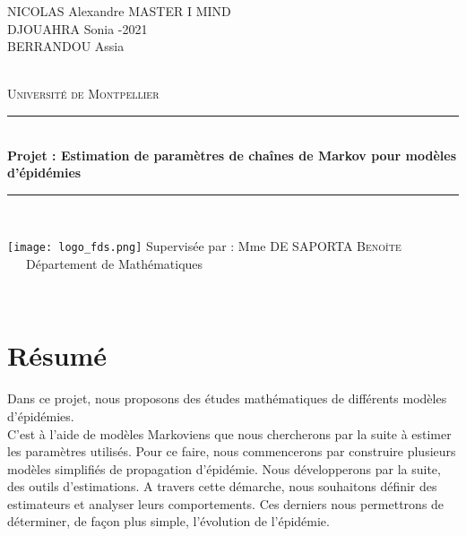 \documentclass[12pt,a4paper]{report}
\newcommand{\HRule}{\rule{\linewidth}{0.5mm}}
\theoremstyle{remark}
\begin{document}
\begin{titlepage}
  \begin{sffamily}  
      \flushleft NICOLAS Alexandre \qquad \qquad \qquad \qquad \qquad\qquad \qquad \qquad  \qquad\qquad \qquad \qquad \qquad  MASTER I MIND
      \\DJOUAHRA Sonia \qquad \qquad \qquad    \qquad \qquad \qquad \qquad \qquad \qquad \qquad \qquad \qquad \qquad \qquad {}-2021
      \\BERRANDOU Assia 

  \begin{center}
 \textsc{}\\[4cm]
    \textsc{\LARGE Université de Montpellier}\\[2cm]
    \HRule \\[0.4cm]
    { \huge \bfseries Projet : Estimation de paramètres de chaînes de Markov pour modèles d'épidémies\\[0.4cm] }
    \HRule \\[2cm]
    \vspace{4cm}
    \begin{minipage}{1\textwidth}
      \begin{flushleft}
       \texttt{[image: logo\_fds.png]}
       \qquad \qquad\qquad\qquad\qquad\qquad\qquad Supervisée par : Mme DE SAPORTA \textsc{Benoîte}\\
       \qquad\qquad\qquad\qquad\qquad\qquad\qquad\qquad\qquad \qquad\qquad \qquad\qquad\qquad\ \ \  Département de Mathématiques
       \end{flushleft}
    \end{minipage}
     \textsc{}\\[1.2cm]
    \vfill
  \end{center}
  \end{sffamily}
\end{titlepage}

\newpage
\section*{Résumé}
Dans ce projet, nous proposons des études mathématiques de différents modèles d'épidémies.\\
C'est à l'aide de modèles Markoviens que nous chercherons par la suite à estimer les paramètres utilisés.
Pour ce faire, nous commencerons par construire plusieurs modèles simplifiés de propagation d'épidémie. Nous développerons par la suite, des outils d'estimations.
A travers cette démarche, nous souhaitons définir des estimateurs et analyser leurs comportements. Ces derniers nous permettrons de déterminer, de façon plus simple, l'évolution de l'épidémie.  
\end{document}

